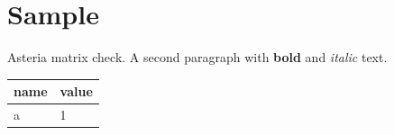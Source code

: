 \documentclass[
]{article}
\author{}
\date{}
\begin{document}
\section{Sample}\label{sample}

Asteria matrix check. A second paragraph with \textbf{bold} and
\emph{italic} text.

\begin{longtable}[]{@{}ll@{}}
\toprule\noalign{}
name & value \\
\midrule\noalign{}
\endhead
\bottomrule\noalign{}
\endlastfoot
a & 1 \\
\end{longtable}
\end{document}
